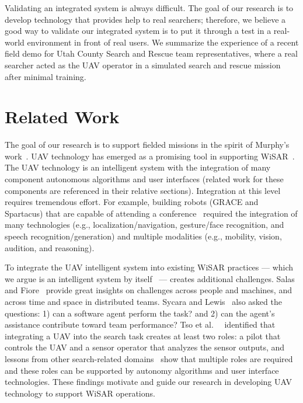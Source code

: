 \documentclass[letterpaper]{article}
\begin{document}
Validating an integrated system is always difficult. The goal of our research is to develop technology that provides help to real searchers; therefore, we believe a good way to validate our integrated system is to put it through a test in a real-world environment in front of real users. We summarize the experience of a recent field demo for Utah County Search and Rescue team representatives, where a real searcher acted as the UAV operator in a simulated search and rescue mission after minimal training.



\section{Related Work}

The goal of our research is to support fielded missions in the spirit of Murphy's work~\cite{casper2003human}. UAV technology has emerged as a promising tool in supporting WiSAR~\cite{bourgault2003coordinated,murphy2008cooperative}. The UAV technology is an intelligent system with the integration of many component autonomous algorithms and user interfaces (related work for these components are referenced in their relative sections). Integration at this level requires tremendous effort. For example, building robots (GRACE and Spartacus) that are capable of attending a conference~\cite{simmons2003grace,michaud2007spartacus} required the integration of many technologies (e.g., localization/navigation, gesture/face recognition, and speech recognition/generation) and multiple modalities (e.g., mobility, vision, audition, and reasoning).

To integrate the UAV intelligent system into existing WiSAR practices --- which we argue is an intelligent system by itself~\cite{setnicka1980WiSAR} --- creates additional challenges. Salas and Fiore~ provide great insights on challenges across people and machines, and across time and space in distributed teams. Sycara and Lewis~ also asked the questions: 1) can a software agent perform the task? and 2) can the agent's assistance contribute toward team performance? Tso et al.\ ~ identified that integrating a UAV into the search task creates at least two roles: a pilot that controls the UAV and a sensor operator that analyzes the sensor outputs, and lessons from other search-related domains~\cite{drury2003awareness} show that multiple roles are required and these roles can be supported by autonomy algorithms and user interface technologies. These findings motivate and guide our research in developing UAV technology to support WiSAR operations.
\end{document}
